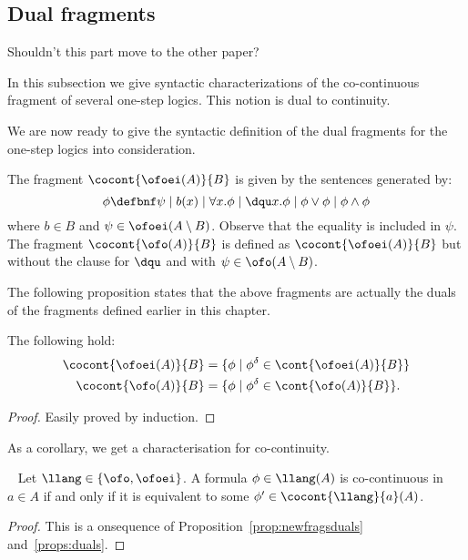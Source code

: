 \newpage


\subsection{Dual fragments}

\btbs
\item
Shouldn't this part move to the other paper?
\etbs

In this subsection we give syntactic characterizations of the co-continuous
fragment of several one-step logics. This notion is dual to continuity.

We are now ready to give the syntactic definition of the dual fragments for the 
one-step logics into consideration.

\begin{definition}\label{def:cocontfrag}\label{def:multfrag}
The fragment $\cocont{\ofoei(A)}{B}$ is given by the sentences generated by:
\[
\phi \defbnf \psi 
   \mid b(x) 
   \mid \forall x.\phi \mid \dqu x.\phi 
   \mid \phi \lor \phi \mid \phi \land \phi
\]
where $b\in B$ and $\psi \in \ofoei(A\setminus B)$. 
Observe that the equality is included in $\psi$. 
The fragment $\cocont{\ofo(A)}{B}$ is defined as $\cocont{\ofoei(A)}{B}$ but without the clause 
for $\dqu$ and with $\psi\in \ofo(A\setminus B)$.
\end{definition}

The following proposition states that the above fragments are actually the duals of the fragments defined earlier in this chapter.

\begin{proposition}\label{prop:newfragsduals}
The following hold:
\begin{align*}
\cocont{\ofoei(A)}{B} &= \{\phi \mid 
   \phi^\delta \in \cont{\ofoei(A)}{B}\} \\
\cocont{\ofo(A)}{B} &= \{\phi \mid 
   \phi^\delta \in \cont{\ofo(A)}{B}\}.
	\end{align*}
\end{proposition}
\begin{proof}
	Easily proved by induction.
\end{proof}

\noindent As a corollary, we get a characterisation for co-continuity.

\begin{corollary}~ \label{cor:cocontinuity}
	Let $\llang \in \{\ofo,\ofoei\}$. A formula $\phi \in \llang(A)$ is co-continuous in $a\in A$ if and only if it is equivalent to some $\phi' \in \cocont{\llang}{a}(A)$.
\end{corollary}
\begin{proof}	
This is a onsequence of Proposition~\ref{prop:newfragsduals} 
and~\ref{props:duals}.
\end{proof}
